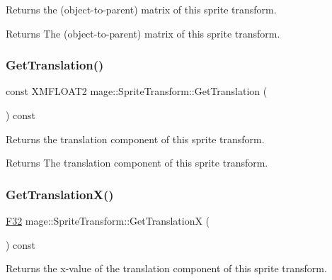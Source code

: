 Returns the (object-\/to-\/parent) matrix of this sprite transform.

\begin{DoxyReturn}{Returns}
The (object-\/to-\/parent) matrix of this sprite transform. 
\end{DoxyReturn}
\hypertarget{structmage_1_1_sprite_transform_ae8103fdc37f52d294d3703709949a30c}{}\label{structmage_1_1_sprite_transform_ae8103fdc37f52d294d3703709949a30c} 
\subsubsection{\texorpdfstring{Get\+Translation()}{GetTranslation()}}
{\footnotesize\ttfamily const X\+M\+F\+L\+O\+A\+T2 mage\+::\+Sprite\+Transform\+::\+Get\+Translation (\begin{DoxyParamCaption}{ }\end{DoxyParamCaption}) const\hspace{0.3cm}{\ttfamily [noexcept]}}

Returns the translation component of this sprite transform.

\begin{DoxyReturn}{Returns}
The translation component of this sprite transform. 
\end{DoxyReturn}
\hypertarget{structmage_1_1_sprite_transform_a27f93a491eed09c33f1ac547df011867}{}\label{structmage_1_1_sprite_transform_a27f93a491eed09c33f1ac547df011867} 
\subsubsection{\texorpdfstring{Get\+Translation\+X()}{GetTranslationX()}}
{\footnotesize\ttfamily \hyperlink{namespacemage_aa97e833b45f06d60a0a9c4fc22ae02c0}{F32} mage\+::\+Sprite\+Transform\+::\+Get\+TranslationX (\begin{DoxyParamCaption}{ }\end{DoxyParamCaption}) const\hspace{0.3cm}{\ttfamily [noexcept]}}

Returns the x-\/value of the translation component of this sprite transform.

